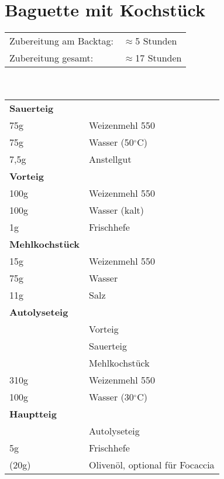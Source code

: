 \section{Baguette mit Kochstück}
\begin{tabular}{ll}
    Zubereitung am Backtag: & $\approx$5 Stunden  \\
    Zubereitung gesamt:     & $\approx$17 Stunden
\end{tabular}\\\paragraph*{}
\begin{tabular}{ll}
    \textbf{Sauerteig} \\
    75g   & Weizenmehl 550                  \\
    75g   & Wasser (50$^\circ$C)            \\
    7,5g  & Anstellgut                      \\
    \textbf{Vorteig} \\
    100g  & Weizenmehl 550                  \\
    100g  & Wasser (kalt)                   \\
    1g    & Frischhefe                      \\
    \textbf{Mehlkochstück} \\
    15g   & Weizenmehl 550                  \\
    75g   & Wasser                          \\
    11g   & Salz                            \\
    \textbf{Autolyseteig} \\
    & Vorteig                         \\
    & Sauerteig                       \\
    & Mehlkochstück                   \\
    310g  & Weizenmehl 550                  \\
    100g  & Wasser (30$^\circ$C)            \\
    \textbf{Hauptteig} \\
    & Autolyseteig                    \\
    5g    & Frischhefe\\
    (20g) & Olivenöl, optional für Focaccia \\
\end{tabular}\\\paragraph*{}
